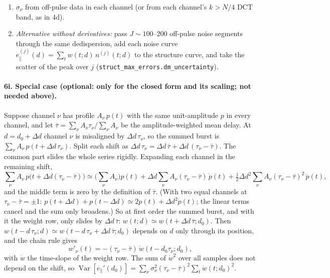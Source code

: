 \documentclass[11pt]{article}
\newcommand{\ep}{e_\parallel}
\newcommand{\tch}{\tau_{\nu}}
\newcommand{\sch}{\sigma_{\nu}}
\newcommand{\Var}{\operatorname{Var}}
\begin{document}
\begin{enumerate}
$\delta=0.1$ and $0.5\,\sigma_{\rm DM}$ agreed at S/N 38, while at S/N 14 the noise in the data-built rows
raised the numerator of Eq.~(\ref{eq:sdm}) by 10\% ($\delta=0.5\,\sigma_{\rm DM}$) and 13\% ($\delta=0.1\,\sigma_{\rm DM}$).
\item \emph{$\sch$} from off-pulse data in each channel (or from each channel's $k>N/4$ DCT band, as in 4d).
\item \emph{Alternative without derivatives:} pass $J\sim100$--200 off-pulse noise segments through the same
dedispersion, add each noise curve $\ep^{(j)}(d)=\sum_tw(t;d)\,n^{(j)}(t;d)$ to the structure curve, and take
the scatter of the peak over $j$ (\texttt{struct\_max\_errors.dm\_uncertainty}).
\end{enumerate}

\paragraph{6i. Special case (optional: only for the closed form and its scaling; not needed above).}
Suppose channel $\nu$ has profile $A_{\nu}\,p(t)$ with the same unit-amplitude $p$ in every channel, and let
$\bar\tau=\sum_{\nu}A_{\nu}\tch/\sum_{\nu}A_{\nu}$ be the amplitude-weighted mean delay.
At $d=d_0+\Delta d$ channel $\nu$ is misaligned by $\Delta d\,\tch$, so the summed burst is
$\sum_{\nu}A_{\nu}\,p(t+\Delta d\,\tch)$. Split each shift as $\Delta d\,\tch=\Delta d\,\bar\tau+\Delta d\,(\tch-\bar\tau)$.
The common part slides the whole series rigidly. Expanding each channel in the remaining shift,
\begin{equation}
\sum_{\nu}A_{\nu}\,p\big(t+\Delta d(\tch-\bar\tau)\big)\simeq\Big(\sum_{\nu}A_{\nu}\Big)p(t)
+\Delta d\sum_{\nu}A_{\nu}(\tch-\bar\tau)\,\dot p(t)+\tfrac12\Delta d^{2}\sum_{\nu}A_{\nu}(\tch-\bar\tau)^{2}\,\ddot p(t),
\end{equation}
and the middle term is zero by the definition of $\bar\tau$. (With two equal channels at $\tch-\bar\tau=\pm1$:
$p(t+\Delta d)+p(t-\Delta d)\simeq2p(t)+\Delta d^{2}\ddot p(t)$; the linear terms cancel and the sum only
broadens.) So at first order the summed burst, and with it the weight row, only slides by $\Delta d\,\bar\tau$:
$w(t;d)\simeq w(t+\Delta d\,\bar\tau;d_0)$. Then $w(t-d\,\tch;d)\simeq w(t-d\,\tch+\Delta d\,\bar\tau;d_0)$
depends on $d$ only through its position, and the chain rule gives
\begin{equation}
w'_{\nu}(t)=-(\tch-\bar\tau)\,\dot w(t-d_0\tch;d_0),
\end{equation}
with $\dot w$ the time-slope of the weight row. The sum of $\dot w^{2}$ over all samples does not depend on the
shift, so $\Var[\ep'(d_0)]=\sum_{\nu}\sch^{2}(\tch-\bar\tau)^{2}\sum_t\dot w(t;d_0)^{2}$.
\end{document}
